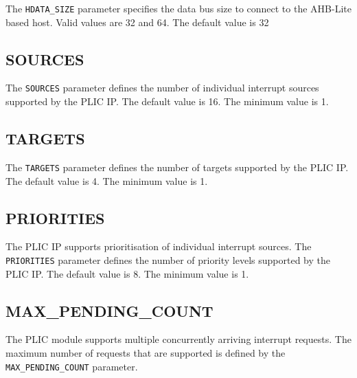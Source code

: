 The \texttt{HDATA\_SIZE} parameter specifies the data bus size to
connect to the AHB-Lite based host. Valid values are 32 and 64. The
default value is 32

\hypertarget{SOURCES}{\subsection{SOURCES}\label{sec:SOURCES}}

The \texttt{SOURCES} parameter defines the number of individual
interrupt sources supported by the PLIC IP. The default value is 16. The
minimum value is 1.

\hypertarget{TARGETS}{\subsection{TARGETS}\label{sec:TARGETS}}

The \texttt{TARGETS} parameter defines the number of targets supported
by the PLIC IP. The default value is 4. The minimum value is 1.

\subsection{PRIORITIES}

The PLIC IP supports prioritisation of individual interrupt sources. The \texttt{PRIORITIES} parameter defines the number of priority levels supported by the PLIC IP. The default value is 8. The minimum value is 1.

\subsection{MAX\_PENDING\_COUNT}

The PLIC module supports multiple concurrently arriving interrupt
requests. The maximum number of requests that are supported is defined
by the \texttt{MAX\_PENDING\_COUNT} parameter.

\begin{comment}
This is unclear.
The MAX_PENDING_COUNT parameter determines how many edge triggered interrupts can be queued. This is per interrupt-source. Each interrupt-source has an interrupt-pending-counter. MAX_PENDING_COUNT indicates the max.number this counter can hold.
If there are more interrupts pending than the counter can hold, then the counter retains its value (ie it 'hit' a ceiling).
The minimum value, of course, is 0, which indicates no pending interrupt.
\end{comment}

